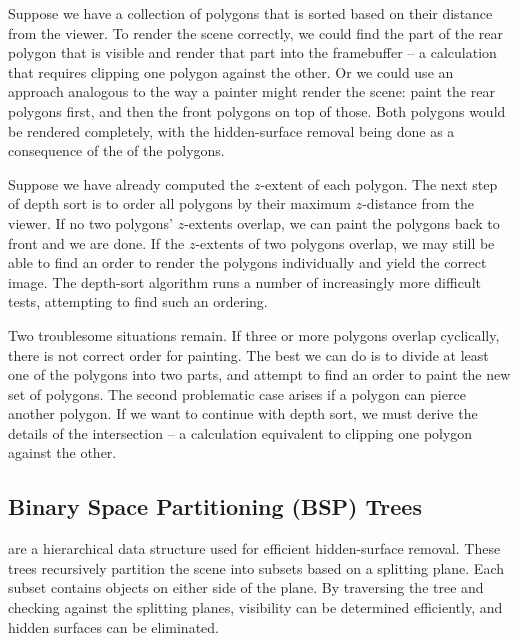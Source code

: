 \documentclass[../COS3712_Notes.tex]{subfiles}
\begin{document}
        Suppose we have a collection of polygons that is sorted based on their distance
        from the viewer.
        To render the scene correctly, we could find the part of the rear polygon
        that is visible and render that part into the framebuffer
        -- a calculation that requires clipping one polygon against the other.
        Or we could use an approach analogous to the way a painter might render the scene:
        paint the rear polygons first, and then the front polygons on top of those.
        Both polygons would be rendered completely, with the hidden-surface removal
        being done as a consequence of the  of the polygons.

        Suppose we have already computed the $z$-extent of each polygon.
        The next step of depth sort is to order all polygons by their maximum $z$-distance
        from the viewer.
        If no two polygons' $z$-extents overlap, we can paint the polygons back to front and we
        are done.
        If the $z$-extents of two polygons overlap, we may still be able to find an order to
        render the polygons individually and yield the correct image.
        The depth-sort algorithm runs a number of increasingly more difficult tests,
        attempting to find such an ordering.

        Two troublesome situations remain.
        If three or more polygons overlap cyclically, there is not correct order for painting.
        The best we can do is to divide at least one of the polygons into two parts,
        and attempt to find an order to paint the new set of polygons.
        The second problematic case arises if a polygon can pierce another polygon.
        If we want to continue with depth sort, we must derive the details of the intersection
        -- a calculation equivalent to clipping one polygon against the other.

      \subsection{Binary Space Partitioning (BSP) Trees}
         are a hierarchical data structure used for efficient hidden-surface
        removal.
        These trees recursively partition the scene into subsets based on a splitting plane.
        Each subset contains objects on either side of the plane.
        By traversing the tree and checking against the splitting planes,
        visibility can be determined efficiently, and hidden surfaces can be eliminated.
\end{document}
